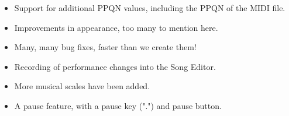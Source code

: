 \documentclass[
 11pt,
 twoside,
 a4paper,
 headinclude,
 footinclude,
 final                                 %
]{article}
\begin{document}
\begin{itemize}
      \item Support for additional PPQN values, including
         the PPQN of the MIDI file.
      \item Improvements in appearance, too many to mention here.
      \item Many, many bug fixes, faster than we create them!
      \item Recording of performance changes into the Song Editor.
      \item More musical scales
         have been added.
      \item A pause feature, with a pause key (".") and pause button.

\end{itemize}
\end{document}
